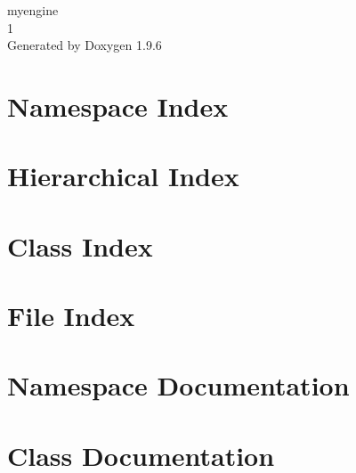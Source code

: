 \documentclass[twoside]{book}
\newcommand{\+}{\discretionary{\mbox{\scriptsize$\hookleftarrow$}}{}{}}
\newcommand{\clearemptydoublepage}{%
    \newpage{\pagestyle{empty}\cleardoublepage}%
  }
\begin{document}
  \raggedbottom
    \hypersetup{pageanchor=false,
                bookmarksnumbered=true,
                pdfencoding=unicode
               }
  \begin{titlepage}
  \vspace*{7cm}
  \begin{center}%
  {\Large myengine}\\
  [1ex]\large 1 \\
  \vspace*{1cm}
  {\large Generated by Doxygen 1.9.6}\\
  \end{center}
  \end{titlepage}
  \clearemptydoublepage
  \tableofcontents
  \clearemptydoublepage
  \hypersetup{pageanchor=true}
\chapter{Namespace Index}

\chapter{Hierarchical Index}

\chapter{Class Index}

\chapter{File Index}

\chapter{Namespace Documentation}

\chapter{Class Documentation}



































\end{document}
